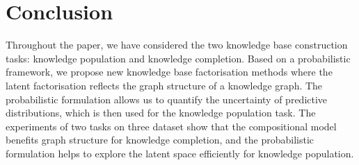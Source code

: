 \section{Conclusion}
Throughout the paper, we have considered the two knowledge base construction tasks: knowledge population and knowledge completion.
Based on a probabilistic framework, we propose new knowledge base factorisation methods where the latent factorisation reflects the graph structure of a knowledge graph. The probabilistic formulation allows us to quantify the uncertainty of predictive distributions, which is then used for the knowledge population task. The experiments of two tasks on three dataset show that the compositional model benefits graph structure for knowledge completion, and the probabilistic formulation helps to explore the latent space efficiently for knowledge population.

